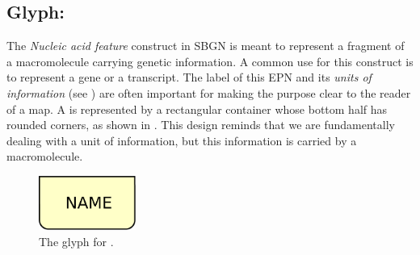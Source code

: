 
\subsection{Glyph: }
\label{sec:genetic}

The \emph{Nucleic acid feature} construct in SBGN is meant to represent a fragment of a macromolecule carrying genetic information.  A common use for this construct is to represent a gene or a transcript.  The label of this EPN and its \emph{units of information} (see ) are often important for making the purpose clear to the reader of a map. A  is represented by a rectangular container whose bottom half has rounded corners, as shown in . This design reminds that we are fundamentally dealing with a unit of information, but this information is carried by a macromolecule.

\begin{figure}[H]
  \centering
  \includegraphics[width = 1.25in]{images/genetic}
  \caption{The \PD glyph for .} 
  \label{fig:genetic}
\end{figure}
